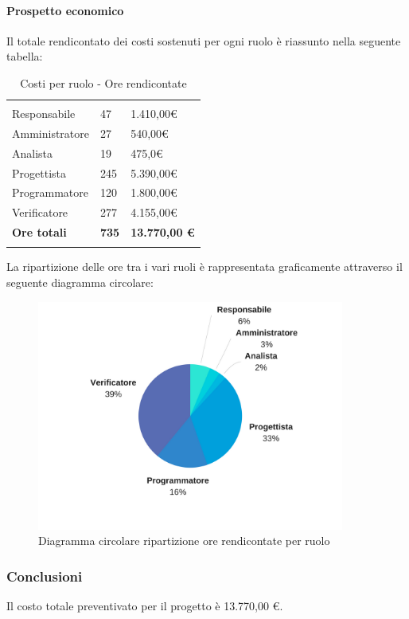 			
			\paragraph{Prospetto economico} \Spazio
			Il totale rendicontato dei costi sostenuti per ogni ruolo è riassunto nella seguente tabella:
			\begin{table}[H]
				\centering
				\begin{tabular}{|p{4cm}|C{4cm}|C{4cm}|}
					
					 & &\\
					Responsabile & 47 & 1.410,00\euro \\
					\hline
					Amministratore& 27 & 540,00\euro \\
					\hline
					Analista & 19 & 475,0\euro \\
					\hline
					Progettista & 245 & 5.390,00\euro \\
					\hline
					Programmatore & 120 & 1.800,00\euro \\
					\hline
					Verificatore & 277 & 4.155,00\euro \\
					\hline
					\textbf{Ore totali} & \textbf{735} & \textbf{13.770,00 \euro} \\
				\end{tabular}
				\caption{Costi per ruolo - Ore rendicontate}
			\end{table}
		
			La ripartizione delle ore tra i vari ruoli è rappresentata graficamente attraverso il seguente diagramma circolare:
		
			\begin{figure}[H] 
				\centering 
				\includegraphics[width=0.9\textwidth]{images/CircolareSoloRendicontate.png} 
				\caption{Diagramma circolare ripartizione ore rendicontate per ruolo}
				\label{CircolareSoloRendicontate}
			\end{figure}
			
		
			
			\subsubsection{Conclusioni}
			
			Il costo totale preventivato per il progetto è 13.770,00 \euro.
